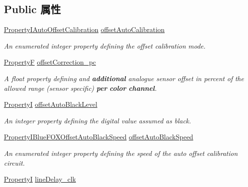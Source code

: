\subsection*{Public 属性}
\begin{DoxyCompactItemize}
\item 
\hyperlink{group___device_specific_interface_gac5eea380ea812d37bc6562246cdff73d}{Property\+I\+Auto\+Offset\+Calibration} \hyperlink{classmv_i_m_p_a_c_t_1_1acquire_1_1_camera_settings_blue_f_o_x_a94b65c4b3b21b5f968ddee1dc804db34}{offset\+Auto\+Calibration}
\begin{DoxyCompactList}\small\item\em An enumerated integer property defining the offset calibration mode. \end{DoxyCompactList}\item 
\hyperlink{group___common_interface_gaf54865fe5a3d5cfd15f9a111b40d09f9}{Property\+F} \hyperlink{classmv_i_m_p_a_c_t_1_1acquire_1_1_camera_settings_blue_f_o_x_a8c4f9f618485d3be2c952343f584bbc5}{offset\+Correction\+\_\+pc}
\begin{DoxyCompactList}\small\item\em A float property defining and {\bfseries additional} analogue sensor offset in percent of the allowed range (sensor specific) {\bfseries per} {\bfseries color} {\bfseries channel}. \end{DoxyCompactList}\item 
\hyperlink{group___common_interface_ga12d5e434238ca242a1ba4c6c3ea45780}{Property\+I} \hyperlink{classmv_i_m_p_a_c_t_1_1acquire_1_1_camera_settings_blue_f_o_x_adcd01df795b09dba9257c30470abba50}{offset\+Auto\+Black\+Level}
\begin{DoxyCompactList}\small\item\em An integer property defining the digital value assumed as black. \end{DoxyCompactList}\item 
\hyperlink{group___device_specific_interface_ga748b74d12ddf41831cc263b764026029}{Property\+I\+Blue\+F\+O\+X\+Offset\+Auto\+Black\+Speed} \hyperlink{classmv_i_m_p_a_c_t_1_1acquire_1_1_camera_settings_blue_f_o_x_ac7a2cb8906b30b94653d4209740a7733}{offset\+Auto\+Black\+Speed}
\begin{DoxyCompactList}\small\item\em An enumerated integer property defining the speed of the auto offset calibration circuit. \end{DoxyCompactList}\item 
\hyperlink{group___common_interface_ga12d5e434238ca242a1ba4c6c3ea45780}{Property\+I} \hyperlink{classmv_i_m_p_a_c_t_1_1acquire_1_1_camera_settings_blue_f_o_x_a3046edfaab3f6f0f909d8ebd4fa0c4c0}{line\+Delay\+\_\+clk}

\end{DoxyCompactItemize}
